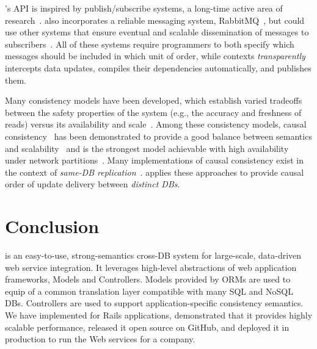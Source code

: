 \synapse's API is inspired by publish/subscribe systems, a long-time active
area of research~\cite{siena,scribe,thialfi,gryphon,pubsubhubbub,hermes}.
\synapse also incorporates a reliable messaging system,
RabbitMQ~\cite{rabbitmq}, but could use other systems that ensure eventual and
scalable dissemination of messages to subscribers~\cite{kafka,scribe}.
All of these systems require programmers to both specify which messages should
be included in which unit of order, while \synapse contexts {\em
transparently} intercepts data updates, compiles their dependencies
automatically, and publishes them.

Many consistency models have been developed, which establish varied tradeoffs
between the safety properties of the system (e.g., the accuracy and freshness of
reads) versus its availability and scale~\cite{brewer-conj}.
Among these consistency models, causal
consistency~\cite{Lamport:1978:TCO:359545.359563}
has been demonstrated to provide a good balance between semantics and
scalability~\cite{cops,eiger} and is the strongest model achievable with high
availability under network partitions~\cite{mahajan11cacTR}.  Many
implementations of causal consistency exist in the context of
{\em same-DB replication}~\cite{eiger,cops,bolton,Du:2013:OSC:2523616.2523628,Belaramani:2006:PR:1267680.1267685,Ladin:1992:PHA:138873.138877,bayou,zawirski13swiftcloud,Wang:2013:RSS:2482626.2482661,Birman:1991:LCA:128738.128742}.  \synapse applies these approaches to provide
causal order of update delivery between {\em distinct DBs}.

\section{Conclusion} \label{synapse:sec:conclusion}

\synapse is an easy-to-use, strong-semantics cross-DB system for
large-scale, data-driven web service integration. It leverages high-level
abstractions of web application frameworks, Models and Controllers. Models
provided by ORMs are used to equip \synapse of a common translation layer
compatible with many SQL and NoSQL DBs. Controllers are used to
support application-specific consistency semantics.
We have implemented \synapse for Rails
applications, demonstrated that it provides highly scalable performance,
released it open source on GitHub, and deployed it in production
to run the Web services for a company.

